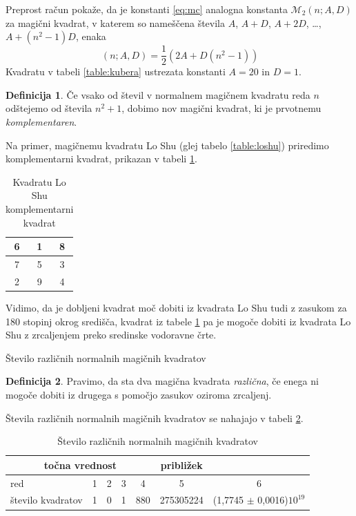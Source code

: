 \documentclass[a4paper,12pt]{article}
\theoremstyle{definition}
\newtheorem{definicija}{Definicija}
\theoremstyle{plain}
\newenvironment{magic}[3]{
   \begin{table}[h]
      \Large
      \centering
      \caption{#1}
      \label{#3}
      \begin{tabular}{|*{#2}{c|}}
         \hline
         }{
      \end{tabular}
   \end{table}
}
\newcommand{\m}{\mathcal{M}_2}
\newcommand{\pojem}[1]{\emph{\color{purple}#1}}
\begin{document}
Preprost račun pokaže, da je konstanti \eqref{eq:mc} analogna konstanta
$\m(n;A,D)$ za magični kvadrat, v katerem so nameščena števila
$A$, $A+D$, $A+2D$, \dots, $A+(n^2-1)D$, enaka %
\begin{equation}
   \,(n; A,D) = \frac{1}{2} (2A + D(n^2 -1))
\end{equation}
Kvadratu v tabeli \ref{table:kubera} ustrezata konstanti $A=20$ in $D=1$.

\begin{definicija}
      Če vsako od števil v normalnem magičnem kvadratu reda $n$ odštejemo
      od števila $n^2+1$, dobimo nov magični kvadrat, ki je prvotnemu
      \pojem{komplementaren}.
\end{definicija}

Na primer, magičnemu kvadratu Lo Shu (glej tabelo \ref{table:loshu}) priredimo
komplementarni kvadrat, prikazan v tabeli \ref{table:closhu}.



\begin{magic}{Kvadratu Lo Shu komplementarni kvadrat}{3}{table:closhu}
   6 & 1 & 8 \\\hline
   7 & 5 & 3 \\\hline
   2 & 9 & 4 \\\hline
\end{magic}

Vidimo, da je dobljeni kvadrat moč dobiti iz kvadrata Lo Shu tudi z zasukom za
180 stopinj okrog središča, kvadrat iz tabele \ref{table:closhu} pa je mogoče dobiti
iz kvadrata Lo Shu z zrcaljenjem preko sredinske vodoravne črte.

Število različnih normalnih magičnih kvadratov

\begin{definicija}
      Pravimo, da sta dva magična kvadrata \pojem{različna}, če enega ni mogoče dobiti
      iz drugega s pomočjo zasukov oziroma zrcaljenj.
\end{definicija}

Števila različnih normalnih magičnih kvadratov se nahajajo v tabeli \ref{table:stevila}.


\begin{table}[h]
   \centering
   \caption{Število različnih normalnih magičnih kvadratov}
   \begin{tabular}{lcccccc} \toprule
      \multicolumn{5}{c}{točna vrednost} & približek \\\midrule
      red & 1 & 2 & 3 & 4 & 5 & 6\\
      število kvadratov & 1 & 0 & 1 & 880 & 275305224 & (1,7745 $\pm$ 0,0016)$10^{19}$\\
      \bottomrule
   \end{tabular}
   \label{table:stevila}
\end{table}
\end{document}
